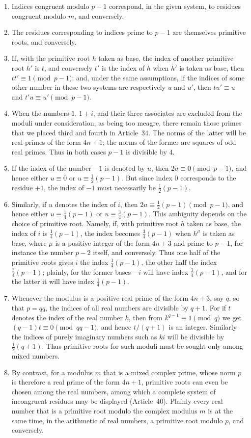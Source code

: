 \documentclass[12pt]{article}
\begin{document}
\begin{enumerate}[label=\Roman*.]
\item Indices congruent modulo $p-1$ correspond, in the given system, to residues congruent modulo $m$, and conversely.
\item The residues corresponding to indices prime to $p-1$ are themselves primitive roots, and conversely.
\item If, with the primitive root $h$ taken as base, the index of another primitive root $h'$ is $t$, and conversely $t'$ is the index of $h$ when $h'$ is taken as base, then $tt'\equiv1\pmod{p-1}$; and, under the same assumptions, if the indices of some other number in these two systems are respectively $u$ and $u'$, then $tu'\equiv u$ and $t'u\equiv u'\pmod{p-1}$.
\item When the numbers $1$, $1+i$, and their three associates are excluded from the moduli under consideration, as being too meagre, there remain those primes that we placed third and fourth in Article~34. The norms of the latter will be real primes of the form $4n+1$; the norms of the former are squares of odd real primes. Thus in both cases $p-1$ is divisible by $4$.
\item If the index of the number $-1$ is denoted by $u$, then $2u\equiv0\pmod{p-1}$, and hence either $u\equiv0$ or $u\equiv\frac12(p-1)$. But since index $0$ corresponds to the residue $+1$, the index of $-1$ must necessarily be $\frac12(p-1)$.
\item Similarly, if $u$ denotes the index of $i$, then $2u\equiv\frac12(p-1)\pmod{p-1}$, and hence either $u\equiv\frac14(p-1)$ or $u\equiv\frac34(p-1)$. This ambiguity depends on the choice of primitive root. Namely, if, with primitive root $h$ taken as base, the index of $i$ is $\frac14(p-1)$, the index becomes $\frac34(p-1)$ when $h^\mu$ is taken as base, where $\mu$ is a positive integer of the form $4n+3$ and prime to $p-1$, for instance the number $p-2$ itself, and conversely. Thus one half of the primitive roots gives $i$ the index $\frac14(p-1)$, the other half the index $\frac34(p-1)$; plainly, for the former bases $-i$ will have index $\frac34(p-1)$, and for the latter it will have index $\frac14(p-1)$.
\item Whenever the modulus is a positive real prime of the form $4n+3$, say $q$, so that $p=qq$, the indices of all real numbers are divisible by $q+1$. For if $t$ denotes the index of the real number $k$, then from $k^{q-1}\equiv1\pmod q$ we get $(q-1)t\equiv0\pmod{qq-1}$, and hence $t/(q+1)$ is an integer. Similarly the indices of purely imaginary numbers such as $ki$ will be divisible by $\frac12(q+1)$. Thus primitive roots for such moduli must be sought only among mixed numbers.
\item By contrast, for a modulus $m$ that is a mixed complex prime, whose norm $p$ is therefore a real prime of the form $4n+1$, primitive roots can even be chosen among the real numbers, among which a complete system of incongruent residues may be displayed (Article~40). Plainly every real number that is a primitive root modulo the complex modulus $m$ is at the same time, in the arithmetic of real numbers, a primitive root modulo $p$, and conversely.
\end{enumerate}
\end{document}
